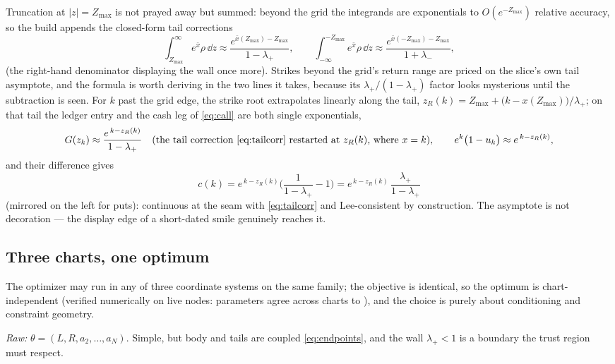 Truncation at $|z|=Z_{\max}$ is not prayed away but summed: beyond the
grid the integrands are exponentials to $O(e^{-Z_{\max}})$ relative
accuracy, so the build appends the closed-form tail corrections
\begin{equation}
\int_{Z_{\max}}^{\infty}e^{\bar{x}}\rho\,\dd z
\approx\frac{e^{\bar{x}(Z_{\max})-Z_{\max}}}{1-\lambda_+},
\qquad
\int_{-\infty}^{-Z_{\max}}e^{\bar{x}}\rho\,\dd z
\approx\frac{e^{\bar{x}(-Z_{\max})-Z_{\max}}}{1+\lambda_-},
\label{eq:tailcorr}
\end{equation}
(the right-hand denominator displaying the wall once more).  Strikes
beyond the grid's return range are priced on the slice's own tail
asymptote, and the formula is worth deriving in the two lines it takes,
because its $\lambda_+/(1-\lambda_+)$ factor looks mysterious until the
subtraction is seen.  For $k$ past the grid edge, the strike root
extrapolates linearly along the tail,
$z_R(k)=Z_{\max}+\big(k-x(Z_{\max})\big)/\lambda_+$; on that tail the
ledger entry and the cash leg of \eqref{eq:call} are both single
exponentials,
\[
G(z_k)\approx\frac{e^{\,k-z_R(k)}}{1-\lambda_+}
\quad\text{(the tail correction \eqref{eq:tailcorr} restarted at
$z_R(k)$, where $x= k$)},
\qquad
e^{k}\big(1-u_k\big)\approx e^{\,k-z_R(k)} ,
\]
and their difference gives
\begin{equation}
c(k)=e^{\,k-z_R(k)}\Big(\frac{1}{1-\lambda_+}-1\Big)
=e^{\,k-z_R(k)}\,\frac{\lambda_+}{1-\lambda_+}
\label{eq:beyondgrid}
\end{equation}
(mirrored on the left for puts): continuous at the seam with
\eqref{eq:tailcorr} and Lee-consistent by construction.  The asymptote is
not decoration --- the display edge of a short-dated smile genuinely
reaches it.

\subsection{Three charts, one optimum}
\label{sec:charts}

The optimizer may run in any of three coordinate systems on the same
family; the objective is identical, so the optimum is chart-independent
(verified numerically on live nodes: parameters agree across charts to
\MacChartEquivParamAgree), and the choice is purely about conditioning
and constraint geometry.

\emph{Raw:} $\theta=(L,R,a_2,\dots,a_N)$.  Simple, but body and tails are
coupled \eqref{eq:endpoints}, and the wall $\lambda_+<1$ is a boundary
the trust region must respect.


